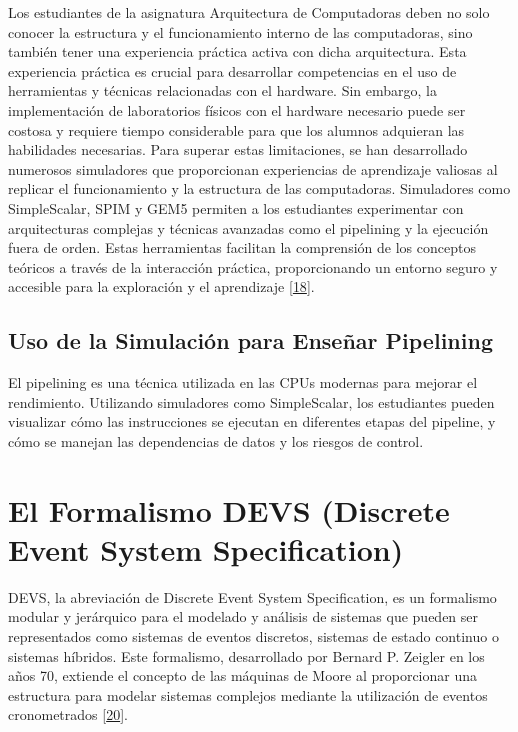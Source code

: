 \documentclass[12pt,twoside]{templates/unerthesis}
\begin{document}
Los estudiantes de la asignatura Arquitectura de Computadoras deben no solo conocer la estructura y el funcionamiento interno de las computadoras, sino también tener una experiencia práctica activa con dicha arquitectura. Esta experiencia práctica es crucial para desarrollar competencias en el uso de herramientas y técnicas relacionadas con el hardware. Sin embargo, la implementación de laboratorios físicos con el hardware necesario puede ser costosa y requiere tiempo considerable para que los alumnos adquieran las habilidades necesarias.
Para superar estas limitaciones, se han desarrollado numerosos simuladores que proporcionan experiencias de aprendizaje valiosas al replicar el funcionamiento y la estructura de las computadoras. Simuladores como SimpleScalar, SPIM y GEM5 permiten a los estudiantes experimentar con arquitecturas complejas y técnicas avanzadas como el pipelining y la ejecución fuera de orden. Estas herramientas facilitan la comprensión de los conceptos teóricos a través de la interacción práctica, proporcionando un entorno seguro y accesible para la exploración y el aprendizaje {[}\protect\hyperlink{ref-skrien_cpu_2001}{18}{]}.

\hypertarget{uso-de-la-simulaciuxf3n-para-enseuxf1ar-pipelining}{%
\subsection{Uso de la Simulación para Enseñar Pipelining}\label{uso-de-la-simulaciuxf3n-para-enseuxf1ar-pipelining}}

El pipelining es una técnica utilizada en las CPUs modernas para mejorar el rendimiento. Utilizando simuladores como SimpleScalar, los estudiantes pueden visualizar cómo las instrucciones se ejecutan en diferentes etapas del pipeline, y cómo se manejan las dependencias de datos y los riesgos de control.

\hypertarget{el-formalismo-devs-discrete-event-system-specification}{%
\section{El Formalismo DEVS (Discrete Event System Specification)}\label{el-formalismo-devs-discrete-event-system-specification}}

DEVS, la abreviación de Discrete Event System Specification, es un formalismo modular y jerárquico para el modelado y análisis de sistemas que pueden ser representados como sistemas de eventos discretos, sistemas de estado continuo o sistemas híbridos. Este formalismo, desarrollado por Bernard P. Zeigler en los años 70, extiende el concepto de las máquinas de Moore al proporcionar una estructura para modelar sistemas complejos mediante la utilización de eventos cronometrados {[}\protect\hyperlink{ref-zeigler_theory_2000}{20}{]}.
\end{document}
